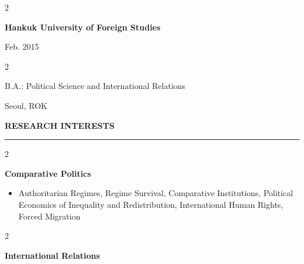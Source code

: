 \documentclass[
  16,
]{article}
\providecommand{\tightlist}{%
  \setlength{\itemsep}{0pt}\setlength{\parskip}{0pt}}
\begin{document}
\begin{large}
  \begin{multicols}{2}
    \begin{flushleft}{\bf Hankuk University of Foreign Studies}\end{flushleft}
    \begin{flushright}Feb. 2015\end{flushright}
  \end{multicols}
  \vspace{-0.17cm}
  \begin{multicols}{2}
    \begin{flushleft}B.A.: Political Science and International Relations\end{flushleft}
    \begin{flushright}Seoul, ROK\end{flushright}
  \end{multicols}
\end{large}
\vspace{7pt}

\begin{large}{\bf RESEARCH INTERESTS}
  \vspace{3pt}
  \hrule
  \begin{multicols}{2}
    \begin{flushleft}{\bf Comparative Politics}\end{flushleft}
    \begin{flushright}\end{flushright}
  \end{multicols}
\end{large}
\vspace{-0.16cm}

\begin{itemize}
\tightlist
\item
  Authoritarian Regimes, Regime Survival, Comparative Institutions,
  Political Economics of Inequality and Redistribution, International
  Human Rights, Forced Migration
\end{itemize}

\vspace{7pt}

\begin{large}
  \begin{multicols}{2}
    \begin{flushleft}{\bf International Relations}\end{flushleft}
    \begin{flushright}\end{flushright}
  \end{multicols}
\end{large}
\vspace{-0.16cm}
\end{document}
